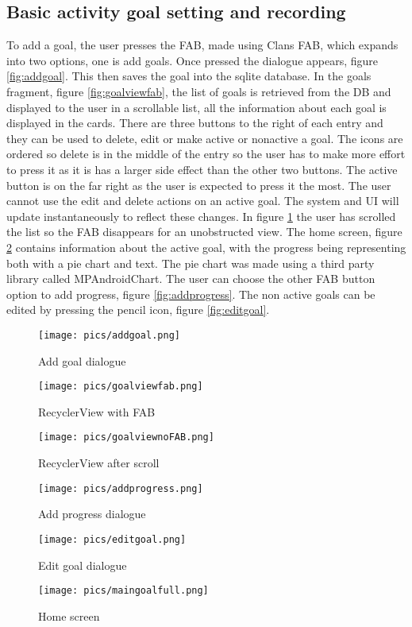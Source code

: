\documentclass[12pt]{report}
\begin{document}
\subsection{Basic activity goal setting and recording}

To add a goal, the user presses the FAB, made using Clans FAB, which expands into two options, one is add goals. Once pressed the dialogue appears, figure \ref{fig:addgoal}. This then saves the goal into the sqlite database. In the goals fragment, figure \ref{fig:goalviewfab}, the list of goals is retrieved from the DB and displayed to the user in a scrollable list, all the information about each goal is displayed in the cards. There are three buttons to the right of each entry and they can be used to delete, edit or make active or nonactive a goal. The icons are ordered so delete is in the middle of the entry so the user has to make more effort to press it as it is has a larger side effect than the other two buttons. The active button is on the far right as the user is expected to press it the most. The user cannot use the edit and delete actions on an active goal. The system and UI will update instantaneously to reflect these changes. 
In figure \ref{fig:goalviewnofab} the user has scrolled the list so the FAB disappears for an unobstructed view. The home screen, figure \ref{fig:maingoalfull} contains information about the active goal, with the progress being representing both with a pie chart and text. The pie chart was made using a third party library called MPAndroidChart.
The user can choose the other FAB button option to add progress, figure \ref{fig:addprogress}. The non active goals can be edited by pressing the pencil icon, figure \ref{fig:editgoal}.

\begin{figure}[!htb]
  \texttt{[image: pics/addgoal.png]}
  \caption{Add goal dialogue}
  \label{fig:addgoal}
\endminipage\hfill
{}
  \texttt{[image: pics/goalviewfab.png]}
  \caption{RecyclerView with FAB}\label{fig:goalviewfab}
\endminipage\hfill
{}%
  \texttt{[image: pics/goalviewnoFAB.png]}
  \caption{RecyclerView after scroll}\label{fig:goalviewnofab}
\endminipage
\end{figure}
\begin{figure}[!htb]
  \texttt{[image: pics/addprogress.png]}
  \caption{Add progress dialogue}
  \label{fig:addprogress}
\endminipage\hfill
{}
  \texttt{[image: pics/editgoal.png]}
  \caption{Edit goal dialogue}\label{fig:editgoal}
\endminipage\hfill
{}%
  \texttt{[image: pics/maingoalfull.png]}
  \caption{Home screen}\label{fig:maingoalfull}
\endminipage
\end{figure}
\end{document}
